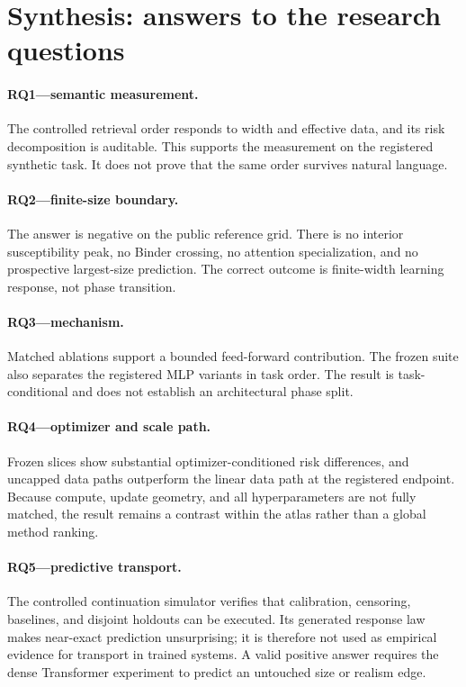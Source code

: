 \section{Synthesis: answers to the research questions}
\label{sec:synthesis}

\paragraph{RQ1---semantic measurement.}
The controlled retrieval order responds to width and effective data, and its
risk decomposition is auditable. This supports the measurement on the
registered synthetic task. It does not prove that the same order survives
natural language.

\paragraph{RQ2---finite-size boundary.}
The answer is negative on the public reference grid. There is no interior
susceptibility peak, no Binder crossing, no attention specialization, and no
prospective largest-size prediction. The correct outcome is finite-width
learning response, not phase transition.

\paragraph{RQ3---mechanism.}
Matched ablations support a bounded feed-forward contribution. The frozen suite
also separates the registered MLP variants in task order. The result is
task-conditional and does not establish an architectural phase split.

\paragraph{RQ4---optimizer and scale path.}
Frozen slices show substantial optimizer-conditioned risk differences, and
uncapped data paths outperform the linear data path at the registered endpoint.
Because compute, update geometry, and all hyperparameters are not fully matched,
the result remains a contrast within the atlas rather than a global method
ranking.

\paragraph{RQ5---predictive transport.}
The controlled continuation simulator verifies that calibration, censoring,
baselines, and disjoint holdouts can be executed. Its generated response law
makes near-exact prediction unsurprising; it is therefore not used as empirical
evidence for transport in trained systems. A valid positive answer requires the
dense Transformer experiment to predict an untouched size or realism edge.

